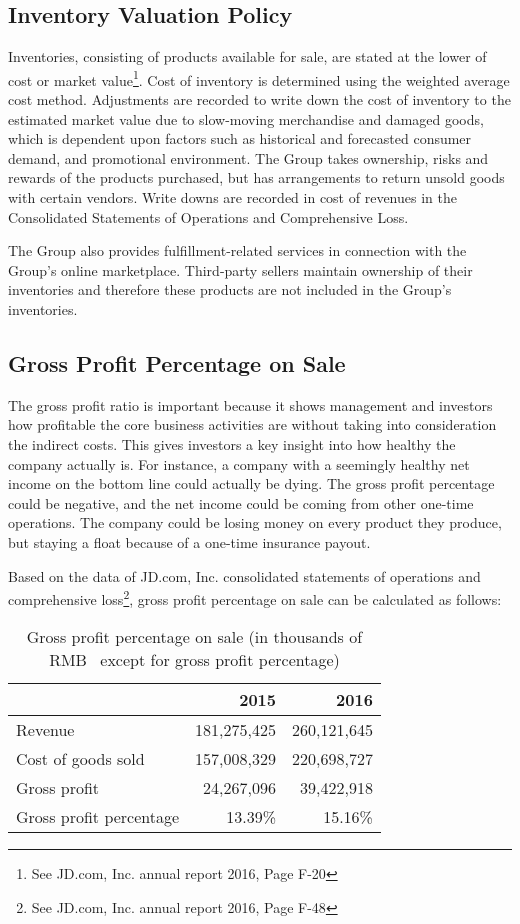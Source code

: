 \subsection{Inventory Valuation Policy}
Inventories, consisting of products available for sale, are stated at the lower of cost or market value\footnote{See JD.com, Inc. annual report 2016, Page F-20}. Cost of inventory is determined using the weighted
average cost method. Adjustments are recorded to write down the cost of inventory to the estimated market value due to slow-moving merchandise and
damaged goods, which is dependent upon factors such as historical and forecasted consumer demand, and promotional environment. The Group takes
ownership, risks and rewards of the products purchased, but has arrangements to return unsold goods with certain vendors. Write downs are recorded in cost of
revenues in the Consolidated Statements of Operations and Comprehensive Loss.

The Group also provides fulfillment-related services in connection with the Group’s online marketplace. Third-party sellers maintain ownership of their
inventories and therefore these products are not included in the Group’s inventories.
\subsection{Gross Profit Percentage on Sale}

The gross profit ratio is important because it shows management and investors how profitable the core business activities are without taking into consideration the indirect costs. This gives investors a key insight into how healthy the company actually is. For instance, a company with a seemingly healthy net income on the bottom line could actually be dying. The gross profit percentage could be negative, and the net income could be coming from other one-time operations. The company could be losing money on every product they produce, but staying a float because of a one-time insurance payout.

Based on the data of JD.com, Inc. consolidated statements of operations and comprehensive loss\footnote{See JD.com, Inc. annual report 2016, Page F-48}, gross profit percentage on sale can be calculated as follows:

\begin{table}[H]	
	\begin{center}
		\begin{tabular}{lrr}
			\toprule
			&\textbf{2015}&\textbf{2016}\\
			\midrule
			Revenue&181,275,425&260,121,645\\
			Cost of goods sold&157,008,329&220,698,727\\
			Gross profit&24,267,096&39,422,918\\
			Gross profit percentage&13.39\%&15.16\%\\
			\bottomrule
		\end{tabular}
	\end{center}
	\caption{Gross profit percentage on sale (in thousands of RMB \textyen\ except for gross profit percentage)}\label{table:1}
\end{table}

